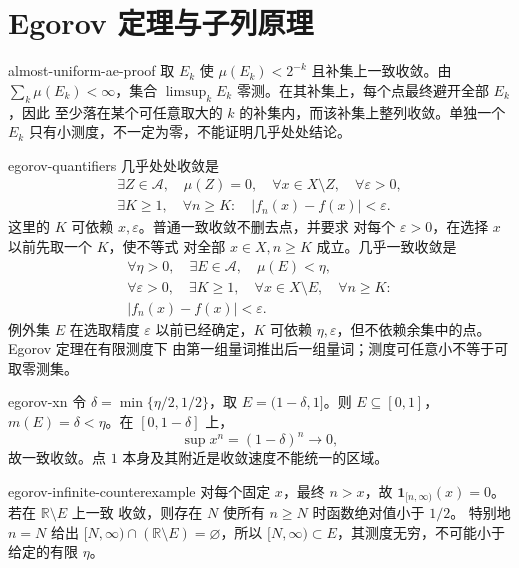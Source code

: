 \chapter{Egorov 定理与子列原理}

\begin{solution}{almost-uniform-ae-proof}
取 \(E_k\) 使 \(\mu(E_k)<2^{-k}\) 且补集上一致收敛。由
\(\sum_k\mu(E_k)<\infty\)，集合
\(\limsup_kE_k\) 零测。在其补集上，每个点最终避开全部 \(E_k\)，因此
至少落在某个可任意取大的 \(k\) 的补集内，而该补集上整列收敛。单独一个
\(E_k\) 只有小测度，不一定为零，不能证明几乎处处结论。
\end{solution}

\begin{solution}{egorov-quantifiers}
几乎处处收敛是
\[
 \begin{gathered}
 \exists Z\in\mathcal A,\quad\mu(Z)=0,\quad
 \forall x\in X\setminus Z,\quad\forall\varepsilon>0,\\
 \exists K\ge1,\quad\forall n\ge K:\quad
 |f_n(x)-f(x)|<\varepsilon.
 \end{gathered}
\]
这里的 \(K\) 可依赖 \(x,\varepsilon\)。普通一致收敛不删去点，并要求
对每个 \(\varepsilon>0\)，在选择 \(x\) 以前先取一个 \(K\)，使不等式
对全部 \(x\in X,n\ge K\) 成立。几乎一致收敛是
\[
 \begin{gathered}
 \forall\eta>0,\quad\exists E\in\mathcal A,\quad\mu(E)<\eta,\\
 \forall\varepsilon>0,\quad\exists K\ge1,\quad
 \forall x\in X\setminus E,\quad\forall n\ge K:\\
 |f_n(x)-f(x)|<\varepsilon.
 \end{gathered}
\]
例外集 \(E\) 在选取精度 \(\varepsilon\) 以前已经确定，\(K\) 可依赖
\(\eta,\varepsilon\)，但不依赖余集中的点。Egorov 定理在有限测度下
由第一组量词推出后一组量词；测度可任意小不等于可取零测集。
\end{solution}

\begin{solution}{egorov-xn}
令 \(\delta=\min\{\eta/2,1/2\}\)，取 \(E=(1-\delta,1]\)。则
\(E\subseteq[0,1]\)，\(m(E)=\delta<\eta\)。在 \([0,1-\delta]\) 上，
\[
 \sup x^n=(1-\delta)^n\to0,
\]
故一致收敛。点 \(1\) 本身及其附近是收敛速度不能统一的区域。
\end{solution}

\begin{solution}{egorov-infinite-counterexample}
对每个固定 \(x\)，最终 \(n>x\)，故
\(\mathbf1_{[n,\infty)}(x)=0\)。若在 \(\mathbb R\setminus E\) 上一致
收敛，则存在 \(N\) 使所有 \(n\ge N\) 时函数绝对值小于 \(1/2\)。
特别地 \(n=N\) 给出
\([N,\infty)\cap(\mathbb R\setminus E)=\varnothing\)，所以
\([N,\infty)\subset E\)，其测度无穷，不可能小于给定的有限 \(\eta\)。
\end{solution}

